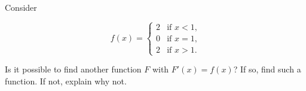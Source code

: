 \documentclass{ximera}
\author{Steven Gubkin}
\begin{document}
\begin{exercise}

Consider

\[
f(x) = \begin{cases}
	2 &\text{if $x<1$,}\\
	0 &\text{if $x =1$,}\\
	2 &\text{if $x>1$.}
\end{cases}
\]

Is it possible to find another function $F$ with $F'(x) = f(x)$?  If so, find such a function.  If not, explain why not.

\begin{freeResponse}

\end{freeResponse}

\end{exercise}
\end{document}
